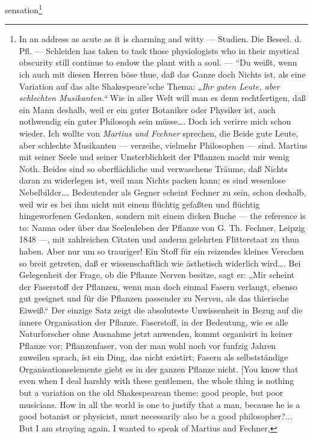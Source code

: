 \documentclass[12pt,a4paper]{book}
\begin{document}
\setcounter{footnote}{0}
sensation\footnote{In an address as acute as it is charming and witty --- Studien.
Die Beseel. d. Pfl. --- Schleiden has taken to task those physiologists who in
their mystical obscurity still continue to endow the plant with a soul. --- ``Du
weißt, wenn ich auch mit diesen Herren böse thue, daß das Ganze doch Nichts ist,
als eine Variation auf das alte Shakespeare'sche Thema: \emph{„Ihr guten Leute,
aber schlechten Musikanten.“} Wie in aller Welt will man es denn rechtfertigen,
daß ein Mann deshalb, weil er ein guter Botaniker oder Physiker ist, auch
nothwendig ein guter Philosoph sein müsse\ldots. Doch ich verirre mich schon
wieder. Ich wollte von \emph{Martius und Fechner} sprechen, die Beide gute Leute,
aber schlechte Musikanten --- verzeihe, vielmehr Philosophen --- sind. Martius mit
seiner Seele und seiner Unsterblichkeit der Pflanzen macht mir wenig Noth. Beides
sind so oberflächliche und verwaschene Träume, daß Nichts daran zu widerlegen ist,
weil man Nichts packen kann; es sind wesenlose Nebelbilder\ldots. Bedeutender als
Gegner scheint Fechner zu sein, schon deshalb, weil wir es bei ihm nicht mit einem
flüchtig gefaßten und flüchtig hingeworfenen Gedanken, sondern mit einem dicken
Buche --- the reference is to: Nanna oder über das Seelenleben der Pflanze von
G. Th. Fechner, Leipzig 1848 ---, mit zahlreichen Citaten und anderm gelehrten
Flitterstaat zu thun haben. Aber nur um so trauriger! Ein Stoff für ein reizendes
kleines Verschen so breit getreten, daß er wissenschaftlich wie ästhetisch
widerlich wird\ldots. Bei Gelegenheit der Frage, ob die Pflanze Nerven besitze,
sagt er: „Mir scheint der Faserstoff der Pflanzen, wenn man doch einmal Fasern
verlangt, ebenso gut geeignet und für die Pflanzen passender zu Nerven, als das
thierische Eiweiß.“ Der einzige Satz zeigt die absoluteste Unwissenheit in Bezug
auf die innere Organisation der Pflanze. Faserstoff, in der Bedeutung, wie es alle
Naturforscher ohne Ausnahme jetzt anwenden, kommt organisirt in keiner Pflanze vor;
Pflanzenfaser, von der man wohl noch vor funfzig Jahren zuweilen sprach, ist ein
Ding, das nicht existirt; Fasern als selbstständige Organisationselemente giebt es
in der ganzen Pflanze nicht. [You know that even when I deal harshly with these
gentlemen, the whole thing is nothing but a variation on the old Shakespearean
theme: good people, but poor musicians. How in all the world is one to justify that
a man, because he is a good botanist or physicist, must necessarily also be a good
philosopher?... But I am straying again. I wanted to speak of Martius and Fechner,
}
\end{document}
